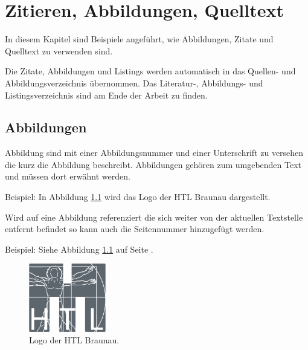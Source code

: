 \chapter{Zitieren, Abbildungen, Quelltext}

In diesem Kapitel sind Beispiele angeführt, wie Abbildungen, Zitate und Quelltext zu verwenden sind.

Die Zitate, Abbildungen und Listings werden automatisch in das Quellen- und Abbildungsverzeichnis übernommen. 
Das Literatur-, Abbildungs- und Listingsverzeichnis sind am Ende der Arbeit zu finden.   

\section{Abbildungen}\label{ref:abbildungen}

Abbildung sind mit einer Abbildungsnummer und einer Unterschrift zu versehen die kurz die Abbildung beschreibt. 
Abbildungen gehören zum umgebenden Text und müssen dort erwähnt werden.

Beispiel: In Abbildung \ref{htl01} wird das Logo der HTL Braunau dargestellt.

Wird auf eine Abbildung referenziert die sich weiter von der aktuellen Textstelle entfernt befindet so kann auch die Seitennummer hinzugefügt werden.

Beispiel: Siehe Abbildung \ref{htl01} auf Seite \pageref{htl01}.


\begin{figure}[H]
	\centering
	\includegraphics[width=0.3\textwidth]{./media/images/htl_moedling.png}
  	\caption{Logo der HTL Braunau.}
  	\label{htl01}
\end{figure}



